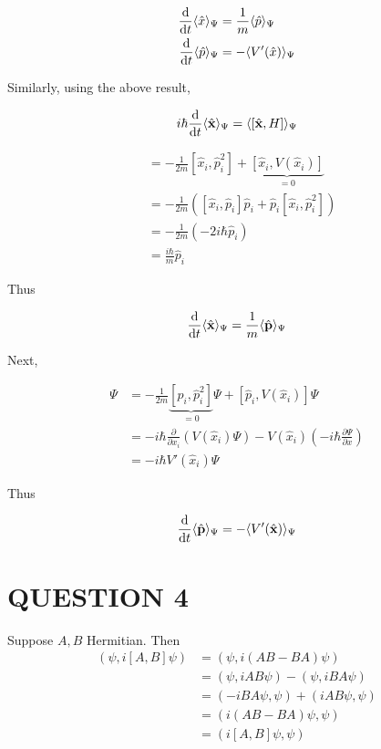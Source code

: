 \documentclass[a4paper]{article}
\begin{document}
\begin{align*}
\frac{\mathrm{d} }{\mathrm{d} t} \langle \hat{x} \rangle_{\Psi} & = \frac{1}{m} \langle \hat{p} \rangle_{\Psi} \\
\frac{\mathrm{d} }{\mathrm{d} t} \langle  \hat{p} \rangle_{\Psi}& = - \langle V'(\hat{x}) \rangle_{\Psi} 
\end{align*}

Similarly, using the above result,

\[ i \hbar \frac{\mathrm{d} }{\mathrm{d} t} \langle \hat{\mathbf{x}} \rangle_{\Psi} = \langle [\hat{\mathbf{x}},H] \rangle_{\Psi} \]

\begin{align*}
[\hat{x}_{i},H_{i}] & = - \frac{1}{2m} [\hat{x}_{i},\hat{p}_{i}^{2}] + \underbrace{[\hat{x}_{i},V(\hat{x}_{i})]}_{=0} \\
& = - \frac{1}{2m}  \left(    [\hat{x}_{i},\hat{p}_{i}] \hat{p}_{i} +  \hat{p}_{i} [\hat{x}_{i},\hat{p}_{i}^{2}]    \right) \\
& = - \frac{1}{2m} (- 2 i \hbar \hat{p}_{i}) \\
& = \frac{i \hbar}{m} \hat{p}_{i}
\end{align*}

Thus 

\[ \frac{\mathrm{d} }{\mathrm{d} t} \langle \hat{\mathbf{x}} \rangle_{\Psi} = \frac{1}{m} \langle \hat{\mathbf{p}} \rangle_{\Psi}  \]

Next,

\begin{align*}
[\hat{p}_{i},H_{i}] \Psi  & =  - \frac{1}{2m} \underbrace{[\hat{p}_{i},\hat{p}_{i}^{2}]}_{=0} \Psi + [\hat{p}_{i},V(\hat{x}_{i})]\Psi \\
& = - i \hbar \frac{\partial }{\partial x_{i}} ( V(\hat{x}_{i}) \Psi ) - V(\hat{x}_{i})(- i \hbar \frac{\partial \Psi }{\partial x}) \\
& = - i \hbar V'(\hat{x}_{i}) \Psi
\end{align*}

Thus

\[ \frac{\mathrm{d} }{\mathrm{d} t} \langle \hat{\mathbf{p}} \rangle_{\Psi} = - \langle V'(\hat{\mathbf{x}}) \rangle_{\Psi}  \]

\section{QUESTION 4}

Suppose $ A,B $ Hermitian. Then
\begin{align*}
(\psi, i[A,B] \psi ) & = (\psi, i(AB - BA) \psi )  \\
& =  (\psi, iAB\psi ) -  (\psi, iBA \psi ) \\
& = (-i B A \psi, \psi ) + ( i A B \psi, \psi) \\
& = (i(AB - BA)\psi,\psi) \\
& = (i[A,B]\psi,\psi)
\end{align*}
\end{document}
